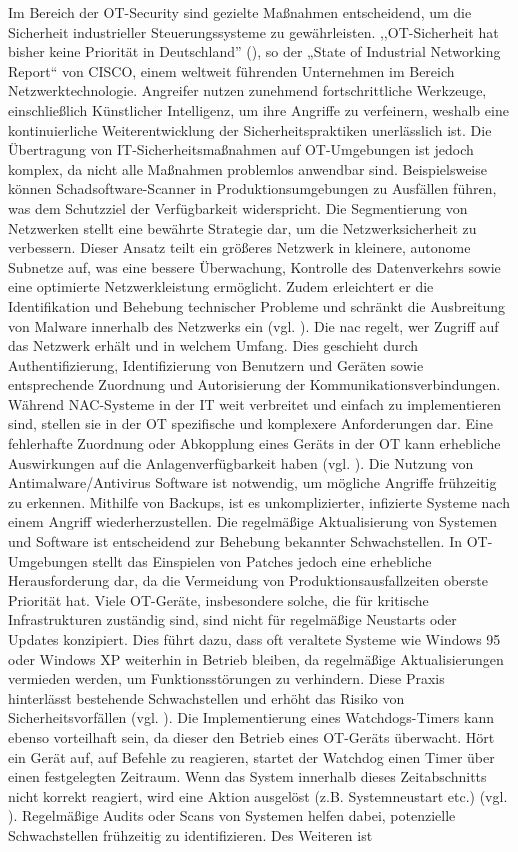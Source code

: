 Im Bereich der OT-Security sind gezielte Maßnahmen entscheidend, um die Sicherheit industrieller Steuerungssysteme zu gewährleisten. ,,OT-Sicherheit hat bisher keine Priorität in Deutschland'' (\cite{CISCO}), so der „State of Industrial Networking Report“ von CISCO, einem weltweit führenden Unternehmen im Bereich Netzwerktechnologie. Angreifer nutzen zunehmend fortschrittliche Werkzeuge, einschließlich Künstlicher Intelligenz, um ihre Angriffe zu verfeinern, weshalb eine kontinuierliche Weiterentwicklung der Sicherheitspraktiken unerlässlich ist. Die Übertragung von IT-Sicherheitsmaßnahmen auf OT-Umgebungen ist jedoch komplex, da nicht alle Maßnahmen problemlos anwendbar sind. Beispielsweise können Schadsoftware-Scanner in Produktionsumgebungen zu Ausfällen führen, was dem Schutzziel der Verfügbarkeit widerspricht. Die Segmentierung von Netzwerken stellt eine bewährte Strategie dar, um die Netzwerksicherheit zu verbessern. Dieser Ansatz teilt ein größeres Netzwerk in kleinere, autonome Subnetze auf, was eine bessere Überwachung, Kontrolle des Datenverkehrs sowie eine optimierte Netzwerkleistung ermöglicht. Zudem erleichtert er die Identifikation und Behebung technischer Probleme und schränkt die Ausbreitung von Malware innerhalb des Netzwerks ein (vgl. \cite{Netzwerksegmentierung}). Die \ac{nac} regelt, wer Zugriff auf das Netzwerk erhält und in welchem Umfang. Dies geschieht durch Authentifizierung, Identifizierung von Benutzern und Geräten sowie entsprechende Zuordnung und Autorisierung der Kommunikationsverbindungen. Während NAC-Systeme in der IT weit verbreitet und einfach zu implementieren sind, stellen sie in der OT spezifische und komplexere Anforderungen dar. Eine fehlerhafte Zuordnung oder Abkopplung eines Geräts in der OT kann erhebliche Auswirkungen auf die Anlagenverfügbarkeit haben (vgl. \cite{NAC}). Die Nutzung von Antimalware/Antivirus Software ist notwendig, um mögliche Angriffe frühzeitig zu erkennen. Mithilfe von Backups, ist es unkomplizierter, infizierte Systeme nach einem Angriff wiederherzustellen. Die regelmäßige Aktualisierung von Systemen und Software ist entscheidend zur Behebung bekannter Schwachstellen. In OT-Umgebungen stellt das Einspielen von Patches jedoch eine erhebliche Herausforderung dar, da die Vermeidung von Produktionsausfallzeiten oberste Priorität hat. Viele OT-Geräte, insbesondere solche, die für kritische Infrastrukturen zuständig sind, sind nicht für regelmäßige Neustarts oder Updates konzipiert. Dies führt dazu, dass oft veraltete Systeme wie Windows 95 oder Windows XP weiterhin in Betrieb bleiben, da regelmäßige Aktualisierungen vermieden werden, um Funktionsstörungen zu verhindern. Diese Praxis hinterlässt bestehende Schwachstellen und erhöht das Risiko von Sicherheitsvorfällen (vgl. \cite{conscia}). \clearpage \noindent Die Implementierung eines Watchdogs-Timers kann ebenso vorteilhaft sein, da dieser den Betrieb eines OT-Geräts überwacht. Hört ein Gerät auf, auf Befehle zu reagieren, startet der Watchdog einen Timer über einen festgelegten Zeitraum. Wenn das System innerhalb dieses Zeitabschnitts nicht korrekt reagiert, wird eine Aktion ausgelöst (z.B. Systemneustart etc.) (vgl. \cite{watchdog}). Regelmäßige Audits oder Scans von Systemen helfen dabei, potenzielle Schwachstellen frühzeitig zu identifizieren. Des Weiteren ist 
